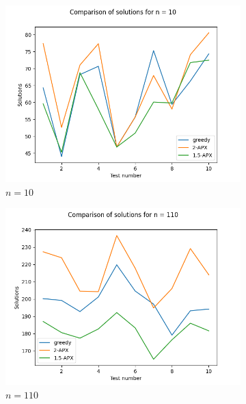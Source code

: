 \documentclass{article}
\begin{document}
\begin{figure}
	\begin{subfigure}{0.5\textwidth}
		\includegraphics[width=\textwidth]{figs/results10-1.png}
		\caption{$n = 10$}
		\label{fig:rezultat10-1}
	\end{subfigure}
	\begin{subfigure}{0.5\textwidth}
		\centering
		\includegraphics[width=\textwidth]{figs/results10-2.png}
		\caption{$n = 110$}
		\label{fig:rezultat10-2}
	\end{subfigure}
	\newline
	\begin{subfigure}{0.5\textwidth}
		\centering

\end{subfigure}
\end{figure}
\end{document}
